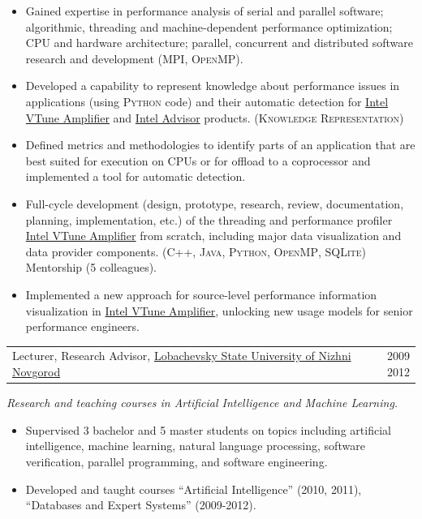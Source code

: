 \documentclass{article}
\makeatletter
\newcommand{\whatwherewhen}[3]{
\noindent\begin{tabular*}{\columnwidth}{@{}@{\extracolsep{\fill}}lr@{}}
#1, #2 & \textsc{#3}
\end{tabular*}}
\newcommand{\smallvskip}{\vskip2mm}
\makeatother
\begin{document}
\begin{itemize}

\item Gained expertise in performance analysis of serial and parallel software; algorithmic, threading and machine-dependent performance optimization; CPU and hardware architecture; parallel, concurrent and distributed software research and development (\textsc{MPI}, \textsc{OpenMP}).

\item Developed a capability to represent knowledge about performance issues in applications (using \textsc{Python} code) and their automatic detection for \href{http://software.intel.com/en-us/intel-vtune-amplifier-xe}{Intel VTune Amplifier} and \href{https://software.intel.com/en-us/intel-advisor-xe}{Intel Advisor} products. (\textsc{Knowledge Representation})

\item Defined metrics and methodologies to identify parts of an application that are best suited for execution on CPUs or for offload to a coprocessor and implemented a tool for automatic detection.

\item Full-cycle development (design, prototype, research, review, documentation, planning, implementation, etc.) of the threading and performance profiler \href{http://software.intel.com/en-us/intel-vtune-amplifier-xe}{Intel VTune Amplifier} from scratch, including major data visualization and data provider components. (\textsc{C++}, \textsc{Java}, \textsc{Python}, \textsc{OpenMP}, \textsc{SQLite}) Mentorship (5 colleagues).

\item Implemented a new approach for source-level performance information visualization in \href{http://software.intel.com/en-us/intel-vtune-amplifier-xe}{Intel VTune Amplifier}, unlocking new usage models for senior performance engineers.

\end{itemize}


\smallvskip
\whatwherewhen{Lecturer, Research Advisor}{\href{http://unn.ru/eng}{Lobachevsky State University of Nizhni Novgorod}}{2009 \textendash{} 2012}

\textit{Research and teaching courses in Artificial Intelligence and Machine Learning.}

\begin{itemize}

\item Supervised 3 bachelor and 5 master students on topics including artificial intelligence, machine learning, natural language processing, software verification, parallel programming, and software engineering.

\item Developed and taught courses ``Artificial Intelligence'' (2010, 2011), ``Databases and Expert Systems'' (2009-2012).

\end{itemize}
\end{document}
